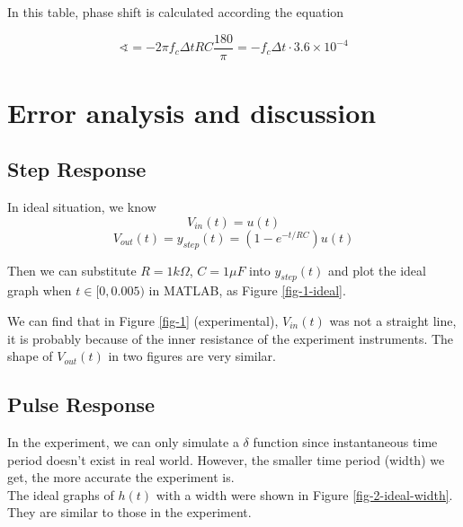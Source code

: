 \documentclass{article}
\begin{document}
In this table, phase shift is calculated according the equation

$$\sphericalangle=-2\pi f_c\Delta t RC \frac{180}{\pi}=-f_c\Delta t\cdot 3.6\times10^{-4}$$

\newpage

\section{Error analysis and discussion}
\subsection{Step Response}
In ideal situation, we know
$$V_{in}(t)=u(t)$$
$$V_{out}(t)=y_{step}(t)=(1-e^{-t/RC})u(t)$$

Then we can substitute $R=1k\Omega$, $C=1\mu F$ into $y_{step}(t)$ and plot the ideal graph when $t\in[0,0.005)$ in MATLAB, as Figure \ref{fig-1-ideal}.


We can find that in Figure \ref{fig-1} (experimental), $V_{in}(t)$ was not a straight line, it is probably because of the inner resistance of the experiment instruments. The shape of $V_{out}(t)$ in two figures are very similar.

\subsection{Pulse Response}
In the experiment, we can only simulate a $\delta$ function since instantaneous time period doesn't exist in real world. However, the smaller time period (width) we get, the more accurate the experiment is. \\

The ideal graphs of $h(t)$ with a width were shown in Figure \ref{fig-2-ideal-width}. They are similar to those in the experiment.\\


\end{document}
